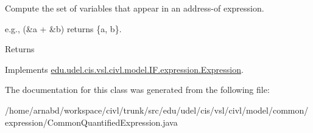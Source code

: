 Compute the set of variables that appear in an address-\/of expression. 

e.\+g., {\ttfamily (\&a + \&b)} returns {\ttfamily \{a, b\}}.

\begin{DoxyReturn}{Returns}

\end{DoxyReturn}


Implements \hyperlink{interfaceedu_1_1udel_1_1cis_1_1vsl_1_1civl_1_1model_1_1IF_1_1expression_1_1Expression_ac2ad0236534bec54b91ee78ff658cbe0}{edu.\+udel.\+cis.\+vsl.\+civl.\+model.\+I\+F.\+expression.\+Expression}.



The documentation for this class was generated from the following file\+:\begin{DoxyCompactItemize}
\item 
/home/arnabd/workspace/civl/trunk/src/edu/udel/cis/vsl/civl/model/common/expression/Common\+Quantified\+Expression.\+java\end{DoxyCompactItemize}
